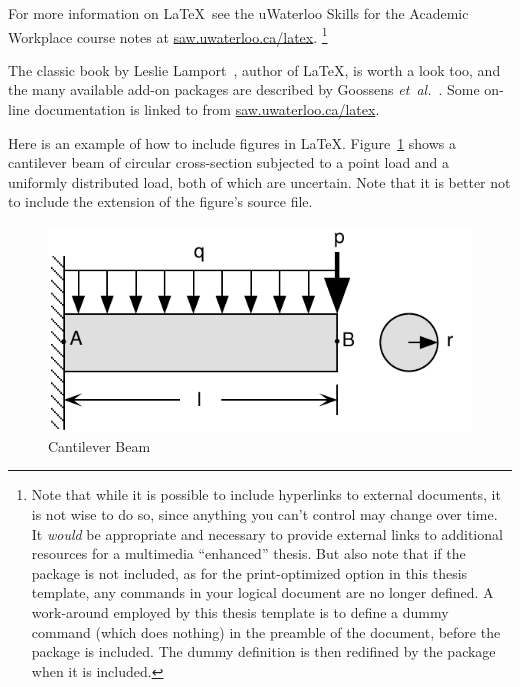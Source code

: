 For more information on \LaTeX\, see the uWaterloo Skills for the Academic Workplace 
course notes at \href{http://saw.uwaterloo.ca/latex}{saw.uwaterloo.ca/latex}. 
\footnote{
Note that while it is possible to include hyperlinks to external documents,
it is not wise to do so, since anything you can't control may change over time. 
It \emph{would} be appropriate and necessary to provide external links to 
additional resources for a multimedia ``enhanced'' thesis. 
But also note that if the  package is not included, 
as for the print-optimized option in this thesis template, any  
commands in your logical document are no longer defined.
A work-around employed by this thesis template is to define a dummy  
command (which does nothing) in the preamble of the document, 
before the  package is included. 
The dummy definition is then redifined by the
 package when it is included.
}

The classic book by Leslie Lamport~\cite{lamport.book}, author of \LaTeX , is worth a look too, and the many available add-on packages are described by 
Goossens \textit{et~al.}~\cite{goossens.book}. Some on-line documentation is linked
to from \href{http://saw.uwaterloo.ca/latex}{saw.uwaterloo.ca/latex}. 



Here is an example of how to include figures in \LaTeX. 
Figure~\ref{fig.beam} shows a cantilever beam of circular cross-section
subjected to a point load and a uniformly distributed load, both of which are uncertain. Note that it is better not to include the extension of the figure's source file.

\begin{figure}[!htbp]
 \begin{center}
  \includegraphics[clip=true]{figures/beam}
 \end{center}
\caption{Cantilever Beam}
\label{fig.beam}
\end{figure}



